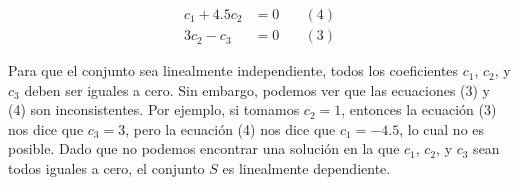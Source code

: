 \begin{itemize}
    \begin{align*}
        c_1 + 4.5c_2 &= 0 \quad &(4) \\
        3c_2 - c_3 &= 0 \quad &(3)
    \end{align*}


    Para que el conjunto sea linealmente independiente, todos los coeficientes $c_1$, $c_2$, y $c_3$ deben ser iguales a cero. Sin embargo, podemos ver que las ecuaciones (3) y (4) son inconsistentes. Por ejemplo, si tomamos $c_2 = 1$, entonces la ecuación (3) nos dice que $c_3 = 3$, pero la ecuación (4) nos dice que $c_1 = -4.5$, lo cual no es posible.
    Dado que no podemos encontrar una solución en la que $c_1$, $c_2$, y $c_3$ sean todos iguales a cero, el conjunto $S$ es linealmente dependiente.

\end{itemize}